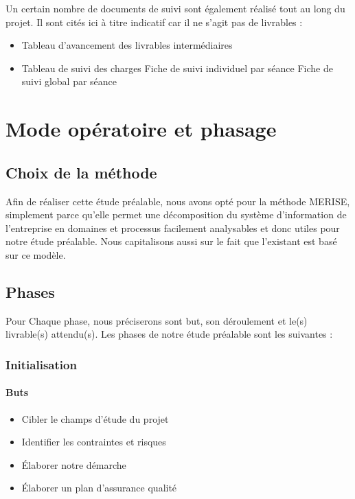 Un certain nombre de documents de suivi sont également réalisé tout au long du projet. Il sont cités ici à titre indicatif car il ne s’agit pas de livrables :
\begin{itemize}
    \item Tableau d’avancement des livrables intermédiaires
    \item Tableau de suivi des charges
        \subitem Fiche de suivi individuel par séance
        \subitem Fiche de suivi global par séance
\end{itemize}

\section{Mode opératoire et phasage}

\subsection{Choix de la méthode}

Afin de réaliser cette étude préalable, nous avons opté pour la méthode MERISE, simplement parce qu'elle permet une décomposition du système d'information de l'entreprise en domaines et processus facilement analysables et donc utiles pour notre étude préalable. Nous capitalisons aussi sur le fait que l’existant est basé sur ce modèle.

\subsection{Phases}

Pour Chaque phase, nous préciserons sont but, son déroulement et le(s) livrable(s) attendu(s). Les phases de notre étude préalable sont les suivantes :

\subsubsection{Initialisation}

\paragraph{Buts}
\begin{itemize}
    \item Cibler le champs d’étude du projet
    \item Identifier les contraintes et risques
    \item Élaborer notre démarche
    \item Élaborer un plan d’assurance qualité
\end{itemize}


